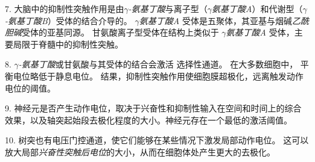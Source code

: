 7. 大脑中的抑制性突触作用是由\textit{$\gamma$-氨基丁酸}与离子型（\textit{$\gamma$氨基丁酸A}）和代谢型（\textit{$\gamma$-氨基丁酸B}）受体的结合介导的。
\textit{$\gamma$氨基丁酸A} 受体是五聚体，其亚基与烟碱\textit{乙酰胆碱}受体的亚基同源。
甘氨酸离子型受体在结构上类似于 \textit{$\gamma$氨基丁酸A} 受体，主要局限于脊髓中的抑制性突触。 


8. \textit{$\gamma$-氨基丁酸}或甘氨酸与其受体的结合会激活  选择性通道。
在大多数细胞中， 平衡电位略低于静息电位。
结果，抑制性突触作用使细胞膜超极化，远离触发动作电位的阈值。


9. 神经元是否产生动作电位，取决于兴奋性和抑制性输入在空间和时间上的综合效果，以及轴突起始段去极化程度的大小。神经元存在一个最低的激活阈值。


10. 树突也有电压门控通道，使它们能够在某些情况下激发局部动作电位。
这可以放大局部\textit{兴奋性突触后电位}的大小，从而在细胞体处产生更大的去极化。







